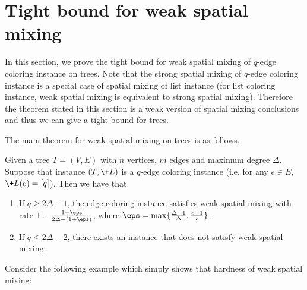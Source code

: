 \section{Tight bound for weak spatial mixing}\label{sec:wsm}
In this section, we prove the tight bound for weak spatial mixing  of $q$-edge coloring instance on trees.
Note that the strong spatial mixing of $q$-edge coloring instance is a special case of spatial mixing of list instance (for list coloring instance, weak spatial mixing is equivalent to strong spatial mixing).
Therefore the theorem stated in this section is a weak version of spatial mixing conclusions and thus we can give a tight bound for trees. 

The main theorem for weak spatial mixing on trees is as follows.
\begin{theorem}\label{thm:tight_WSM}
    Given a tree $T = (V,E)$ with $n$ vertices, $m$ edges and maximum degree $\Delta$.
    Suppose that instance $(T,\+L)$ is a $q$-edge coloring instance (i.e. for any $e\in E$, $\+L(e) = [q]$). 
    Then we have that
    \begin{enumerate}
        \item If $q \geq 2\Delta - 1$, the edge coloring instance satisfies weak spatial mixing with rate $1 - \frac{1 - \eps}{2\Delta - (1+\eps)}$, where $\eps = \max\{\frac{\Delta - 1}{\Delta}, \frac {e - 1}e\}$.
        \item If $q \leq 2\Delta - 2$, there exists an instance that does not satisfy weak spatial mixing.
    \end{enumerate}
\end{theorem}
Consider the following example which simply shows that hardness of weak spatial mixing:
